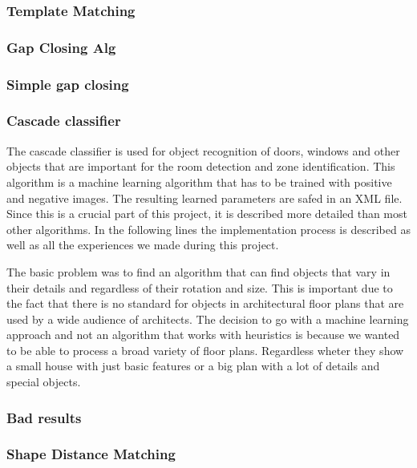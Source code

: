 \subsubsection{Template Matching}
\subsubsection{Gap Closing Alg}
\subsubsection{Simple gap closing}
\subsubsection{Cascade classifier}
The cascade classifier is used for object recognition of doors, windows and other objects that are important for the room detection and zone identification. This algorithm is a machine learning algorithm that has to be trained with positive and negative images. The resulting learned parameters are safed in an XML file. Since this is a crucial part of this project, it is described more detailed than most other algorithms. In the following lines the implementation process is described as well as all the experiences we made during this project.

The basic problem was to find an algorithm that can find objects that vary in their details and regardless of their rotation and size. This is important due to the fact that there is no standard for objects in architectural floor plans that are used by a wide audience of architects. The decision to go with a machine learning approach and not an algorithm that works with heuristics is because we wanted to be able to process a broad variety of floor plans. Regardless wheter they show a small house with just basic features or a big plan with a lot of details and special objects.




\subsubsection{Bad results}
\subsubsection{Shape Distance Matching}
